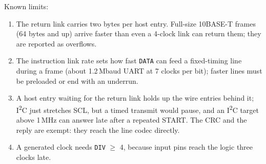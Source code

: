 \documentclass[11pt,a4paper]{article}
\newcommand{\sig}[1]{\texttt{#1}}
\begin{document}
Known limits:
\begin{enumerate}
\item The return link carries two bytes per host entry. Full-size 10BASE-T frames (64 bytes and up) arrive faster than even a 4-clock link can return them; they are reported as overflows.
\item The instruction link rate sets how fast \sig{DATA} can feed a fixed-timing line during a frame (about 1.2\,Mbaud UART at 7 clocks per bit); faster lines must be preloaded or end with an underrun.
\item A host entry waiting for the return link holds up the wire entries behind it; I\textsuperscript{2}C just stretches SCL, but a timed transmit would pause, and an I\textsuperscript{2}C target above 1\,MHz can answer late after a repeated START. The CRC and the reply are exempt: they reach the line codec directly.
\item A generated clock needs \sig{DIV} $\ge$ 4, because input pins reach the logic three clocks late.
\end{enumerate}
\end{document}

